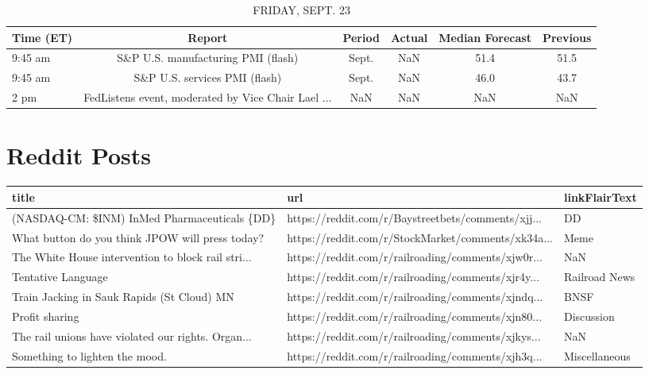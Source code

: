 \documentclass{book}
\begin{document}
  
  \begin{table}[htbp]%
  \caption{FRIDAY, SEPT. 23}%
  \centering%
  \begin{adjustbox}{width=1\textwidth}%
  \begin{tabular}{lccccc}
  \toprule
  Time (ET) &                                             Report & Period & Actual & Median Forecast & Previous \\
  \midrule
    9:45 am &                 S\&P U.S. manufacturing PMI (flash) &  Sept. &    NaN &            51.4 &     51.5 \\
    9:45 am &                      S\&P U.S. services PMI (flash) &  Sept. &    NaN &            46.0 &     43.7 \\
       2 pm & FedListens event, moderated by Vice Chair Lael ... &    NaN &    NaN &             NaN &      NaN \\
  \bottomrule
  \end{tabular}
  \end{adjustbox}%
  \end{table}
  
  \section*{Reddit Posts}%
  \label{sec:RedditPosts}%
  
  
  \begin{table}[htbp]%
  \centering%
  \begin{adjustbox}{width=1\textwidth}%
  \begin{tabular}{lll}
  \toprule
                                               title &                                                url & linkFlairText \\
  \midrule
        (NASDAQ-CM: \$INM) InMed Pharmaceuticals \{DD\} & https://reddit.com/r/Baystreetbets/comments/xjj... &            DD \\
     What button do you think JPOW will press today? & https://reddit.com/r/StockMarket/comments/xk34a... &          Meme \\
  The White House intervention to block rail stri... & https://reddit.com/r/railroading/comments/xjw0r... &           NaN \\
                                  Tentative Language & https://reddit.com/r/railroading/comments/xjr4y... & Railroad News \\
          Train Jacking in Sauk Rapids (St Cloud) MN & https://reddit.com/r/railroading/comments/xjndq... &          BNSF \\
                                      Profit sharing & https://reddit.com/r/railroading/comments/xjn80... &    Discussion \\
  The rail unions have violated our rights. Organ... & https://reddit.com/r/railroading/comments/xjkys... &           NaN \\
                      Something to lighten the mood. & https://reddit.com/r/railroading/comments/xjh3q... & Miscellaneous \\
  \bottomrule
  \end{tabular}
  \end{adjustbox}%
  \end{table}
  
\end{document}
